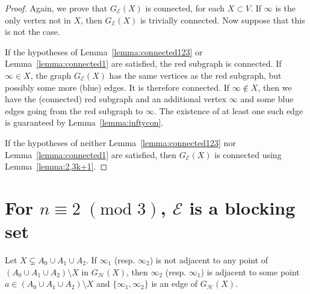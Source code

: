 \documentclass[11pt,a4paper]{article}
\begin{document}
\begin{proof}
Again, we prove that $G_{\mathcal{E}}(X)$ is connected, for each $X\subset V$. If $\infty$ is the only vertex not in $X$, then $G_{\mathcal{E}}(X)$ is trivially connected. Now suppose that this is not the case.

If the hypotheses of Lemma~\ref{lemma:connected123} or Lemma~\ref{lemma:connected1} are satisfied, the red subgraph is connected. If $\infty \in X$, the graph $G_{\mathcal{E}}(X)$ has the same vertices as the red subgraph, but possibly some more (blue) edges. It is therefore connected. If $\infty\not\in X$, then we have the (connected) red subgraph and an additional vertex $\infty$ and some blue edges going from the red subgraph to $\infty$. The existence of at least one such edge is guaranteed by  Lemma~\ref{lemma:inftycon}.

If the hypotheses of neither Lemma~\ref{lemma:connected123} nor Lemma~\ref{lemma:connected1} are satisfied, then $G_{\mathcal{E}}(X)$ is connected using Lemma~\ref{lemma:2,3k+1}.
\end{proof}



\section{For \texorpdfstring{$n \equiv 2 \; ({\mbox{mod }} 3)$, $\mathcal{E}$}{} is a blocking set}\label{sec:2mod3}


\begin{lemma}
\label{lemma:inftyonetwocon}
    Let $X \subsetneq A_0 \cup A_1 \cup A_2$. If $\infty_1$ (resp. $\infty_2$) is not adjacent to any point of $(A_0 \cup A_1 \cup A_2) \setminus X$ in $G_{\mathcal{H}}(X)$, then $\infty_2$ (resp. $\infty_1$) is adjacent to some point $a \in (A_0 \cup A_1 \cup A_2) \setminus X$ and $\{ \infty_1, \infty_2 \}$ is an edge of $G_{\mathcal{H}}(X)$.
\end{lemma}
\end{document}
